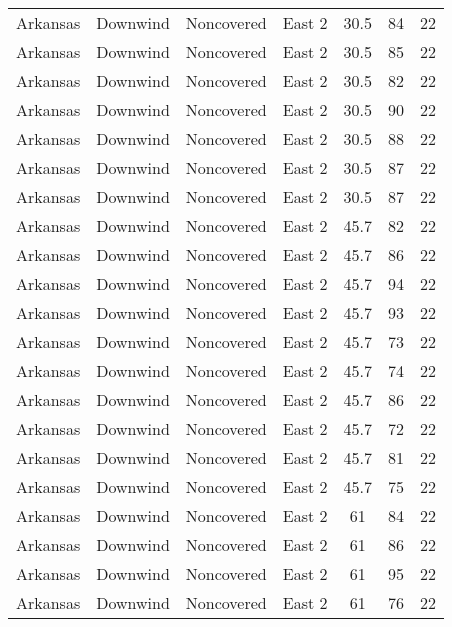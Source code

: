 \documentclass{article}
\begin{document}
\begin{longtable}[H]{ccccccc}
Arkansas & Downwind  & Noncovered & East 2        & 30.5         & 84          & 22  \\
Arkansas & Downwind  & Noncovered & East 2        & 30.5         & 85          & 22  \\
Arkansas & Downwind  & Noncovered & East 2        & 30.5         & 82          & 22  \\
Arkansas & Downwind  & Noncovered & East 2        & 30.5         & 90          & 22  \\
Arkansas & Downwind  & Noncovered & East 2        & 30.5         & 88          & 22  \\
Arkansas & Downwind  & Noncovered & East 2        & 30.5         & 87          & 22  \\
Arkansas & Downwind  & Noncovered & East 2        & 30.5         & 87          & 22  \\
Arkansas & Downwind  & Noncovered & East 2        & 45.7         & 82          & 22  \\
Arkansas & Downwind  & Noncovered & East 2        & 45.7         & 86          & 22  \\
Arkansas & Downwind  & Noncovered & East 2        & 45.7         & 94          & 22  \\
Arkansas & Downwind  & Noncovered & East 2        & 45.7         & 93          & 22  \\
Arkansas & Downwind  & Noncovered & East 2        & 45.7         & 73          & 22  \\
Arkansas & Downwind  & Noncovered & East 2        & 45.7         & 74          & 22  \\
Arkansas & Downwind  & Noncovered & East 2        & 45.7         & 86          & 22  \\
Arkansas & Downwind  & Noncovered & East 2        & 45.7         & 72          & 22  \\
Arkansas & Downwind  & Noncovered & East 2        & 45.7         & 81          & 22  \\
Arkansas & Downwind  & Noncovered & East 2        & 45.7         & 75          & 22  \\
Arkansas & Downwind  & Noncovered & East 2        & 61           & 84          & 22  \\
Arkansas & Downwind  & Noncovered & East 2        & 61           & 86          & 22  \\
Arkansas & Downwind  & Noncovered & East 2        & 61           & 95          & 22  \\
Arkansas & Downwind  & Noncovered & East 2        & 61           & 76          & 22  \\

\end{longtable}
\end{document}
